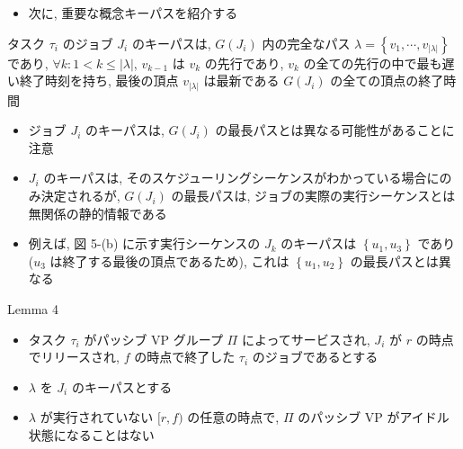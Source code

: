 \begin{frame}{}
    \begin{itemize}
        \item 次に, 重要な概念キーパスを紹介する
    \end{itemize}
\end{frame}

\begin{frame}{}
    \begin{definition}[キーパス]
        タスク $\tau_{i}$ のジョブ $J_{i}$ のキーパスは, $G\left(J_{i}\right)$ 内の完全なパス $\lambda=\left\{v_{1}, \cdots, v_{|\lambda|}\right\}$ であり, $\forall k: 1<k \leq|\lambda|$, $v_{k-1}$ は $v_{k}$ の先行であり, $v_{k}$ の全ての先行の中で最も遅い終了時刻を持ち, 最後の頂点 $v_{|\lambda|}$ は最新である $G\left(J_{i}\right)$ の全ての頂点の終了時間
    \end{definition}
\end{frame}

\begin{frame}{}
    \begin{itemize}
        \item ジョブ $J_{i}$ のキーパスは, $G\left(J_{i}\right)$ の最長パスとは異なる可能性があることに注意
\item $J_{i}$ のキーパスは, そのスケジューリングシーケンスがわかっている場合にのみ決定されるが, $G\left(J_{i}\right)$ の最長パスは, ジョブの実際の実行シーケンスとは無関係の静的情報である
\item 例えば, 図 5-(b) に示す実行シーケンスの $J_{k}$ のキーパスは $\left\{u_{1}, u_{3}\right\}$ であり ($u_{3}$ は終了する最後の頂点であるため), これは $\left\{u_{1}, u_{2}\right\}$ の最長パスとは異なる
    \end{itemize}
\end{frame}

\begin{frame}[label=lemma4]{Lemma 4}
    \begin{lemma}[]
        \begin{itemize}
            \item タスク $\tau_{i}$ がパッシブ VP グループ $\Pi$ によってサービスされ, $J_{i}$ が $r$ の時点でリリースされ, $f$ の時点で終了した $\tau_{i}$ のジョブであるとする
\item $\lambda$ を $J_{i}$ のキーパスとする
\item $\lambda$ が実行されていない $[r, f)$ の任意の時点で, $\Pi$ のパッシブ VP がアイドル状態になることはない
        \end{itemize}
    \end{lemma}
\end{frame}

